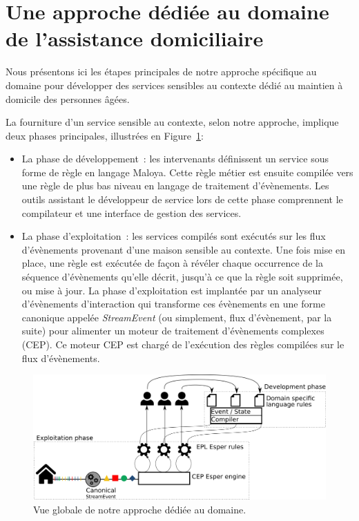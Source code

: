 \section{Une approche dédiée au domaine de l'assistance domiciliaire}
Nous présentons ici les étapes principales de notre approche spécifique au domaine 
pour développer des services sensibles au contexte dédié au maintien à domicile 
des personnes âgées.

La fourniture d'un service sensible au contexte, selon notre approche, implique deux phases principales, illustrées en Figure~\ref{fig:functionalarchi}: 
\begin{itemize}
\item La phase de développement~: les intervenants définissent un service sous 
forme de règle en langage Maloya. Cette règle métier est ensuite compilée vers une règle de plus bas niveau en 
langage de traitement d'évènements. Les outils assistant le développeur de service lors de cette phase comprennent le 
compilateur et une interface de gestion des services.
\item La phase d'exploitation~: les services compilés sont exécutés sur les flux 
d'évènements provenant d'une maison sensible au contexte. Une fois mise en place, une règle est 
exécutée de façon à révéler chaque occurrence de la séquence d'évènements 
qu'elle décrit, jusqu'à ce que la règle soit supprimée, ou mise à jour. 
La phase d'exploitation est implantée par un analyseur d'évènements d'interaction qui 
transforme ces évènements en une forme canonique appelée {\em StreamEvent} 
(ou simplement, flux d'évènement, par la suite) pour alimenter un moteur de traitement d'évènements 
complexes (CEP). Ce moteur CEP est chargé de l'exécution des règles compilées sur le flux d'évènements.
\end{itemize}
\begin{figure}[h]
\centering
  \includegraphics[width=\linewidth,totalheight=\textheight,keepaspectratio]{gfx/approach}
\caption{Vue globale de notre approche dédiée au domaine.}
\label{fig:functionalarchi}
\end{figure}

